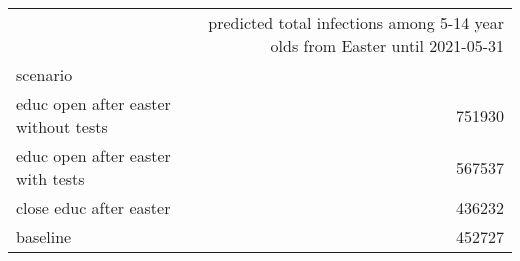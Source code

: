\begin{tabular}{lr}
\toprule
{} &  predicted total infections among 5-14 year olds from Easter until 2021-05-31 \\
scenario                               &                                                                               \\
\midrule
 educ open after easter  without tests &                                             751930 \\
 educ open after easter  with tests    &                                             567537 \\
 close educ after easter               &                                             436232 \\
 baseline                              &                                             452727 \\
\bottomrule
\end{tabular}
